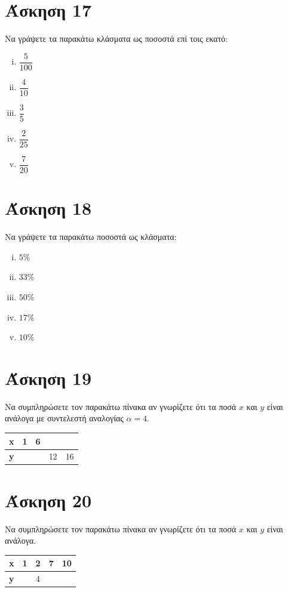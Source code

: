 \documentclass[a4paper,10pt]{report}
\begin{document}
\section*{Άσκηση 17  \hfill \small{}}
Να γράψετε τα παρακάτω κλάσματα ως ποσοστά επί τοις εκατό:
\begin{enumerate}[i)]
 \item $\dfrac{5}{100}$
 \item $\dfrac{4}{10}$
 \item $\dfrac{3}{5}$
 \item $\dfrac{2}{25}$
 \item $\dfrac{7}{20}$
\end{enumerate}

\section*{Άσκηση 18  \hfill \small{}}
Να γράψετε τα παρακάτω  ποσοστά ως κλάσματα:
\begin{enumerate}[i)]
 \item $5\%$
 \item $33\%$
 \item $50\%$
 \item $17\%$
 \item $10\%$
\end{enumerate}

\section*{Άσκηση 19  \hfill \small{}}
Να συμπληρώσετε τον παρακάτω πίνακα αν γνωρίζετε ότι τα ποσά $x$ και $y$ είναι ανάλογα με συντελεστή αναλογίας $α=4$.
\begin{center}
\begin{tabular}{|c|c|c|c|l|}\hline
\textbf{x} & 1 & 6 &    &  \\\hline
\textbf{y} &   &   & 12 & 16\\\hline
\end{tabular}
\end{center}

\section*{Άσκηση 20  \hfill \small{}}
Να συμπληρώσετε τον παρακάτω πίνακα αν γνωρίζετε ότι τα ποσά $x$ και $y$ είναι ανάλογα.
\begin{center}
\begin{tabular}{|c|c|c|c|l|}\hline
\textbf{x} & 1 & 2 & 7 & 10 \\\hline
\textbf{y} &   & 4 &   & \\\hline
\end{tabular}
\end{center}
\end{document}
